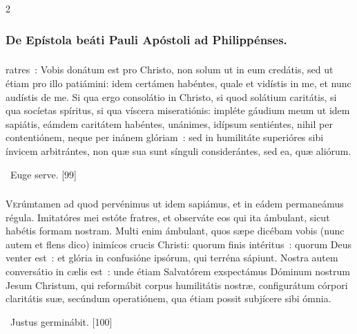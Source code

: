 \documentclass[9pt,twoside]{extarticle}
\begin{document}
\begin{multicols}{2}
{{\begin{tightlist}{}
\item {}
\end{tightlist}

\subsubsection*{\center De Epístola beáti Pauli Apóstoli ad Philippénses.}
\subsubsection*{\center {}}
ratres~: Vobis donátum est pro Christo, non solum ut in eum credátis, sed ut étiam pro illo patiámini:
idem certámen habéntes, quale et vidístis in me, et nunc audístis de me. Si qua ergo consolátio in Christo, si quod solátium caritátis, si qua socíetas spíritus, si qua víscera miseratiónis:
impléte gáudium meum ut idem sapiátis, eámdem caritátem habéntes, unánimes, idípsum sentiéntes,
nihil per contentiónem, neque per inánem glóriam~: sed in humilitáte superióres sibi ínvicem arbitrántes,
non quæ sua sunt sínguli considerántes, sed ea, quæ aliórum.

\begin{tightlist}{}
\item {}~Euge serve. [99]
\end{tightlist}

\subsubsection*{\center {}}
\lettrine{V}erúmtamen ad quod pervénimus ut idem sapiámus, et in eádem permaneámus régula.
Imitatóres mei estóte fratres, et observáte eos qui ita ámbulant, sicut habétis formam nostram.
Multi enim ámbulant, quos sæpe dicébam vobis (nunc autem et flens dico) inimícos crucis Christi:
quorum finis intéritus~: quorum Deus venter est~: et glória in confusióne ipsórum, qui terréna sápiunt.
Nostra autem conversátio in cælis est~: unde étiam Salvatórem exspectámus Dóminum nostrum Jesum Christum, qui reformábit corpus humilitátis nostræ, configurátum córpori claritátis suæ, secúndum operatiónem, qua étiam possit subjícere sibi ómnia.

\begin{tightlist}{}
\item {}~Justus germinábit. [100]
\end{tightlist}

}}
\end{multicols}
\end{document}
